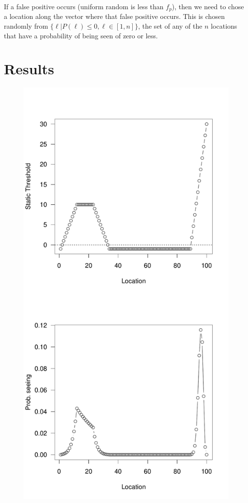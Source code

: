 \documentclass{article}
\begin{document}
If a false positive occurs (uniform random is less than $f_p$), then we need to chose a
location along the vector where that false positive occurs. This is chosen randomly from
$\{\ell | P(\ell) \le 0, \ell\in[1,n]\}$, the set of 
any of the $n$ locations that have a probability of being seen of zero or less.


\section{Results}

\begin{figure}
  \centering
  \includegraphics[scale=0.3,page=1]{eg1.pdf}

\end{figure}
\end{document}
